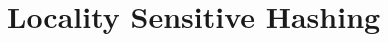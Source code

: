 \documentclass{article}
\begin{document}





\section{Locality Sensitive Hashing}\label{sec:background}
\end{document}

